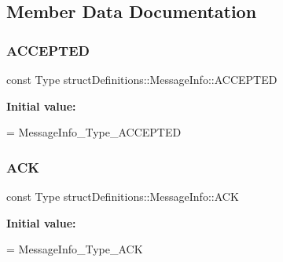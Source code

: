 \subsection{Member Data Documentation}
\hypertarget{classstruct_definitions_1_1_message_info_adf4fb3a2667aa56ebee6463c8fb68eed}{}\label{classstruct_definitions_1_1_message_info_adf4fb3a2667aa56ebee6463c8fb68eed} 
\subsubsection{\texorpdfstring{A\+C\+C\+E\+P\+T\+ED}{ACCEPTED}}
{\footnotesize\ttfamily const Type struct\+Definitions\+::\+Message\+Info\+::\+A\+C\+C\+E\+P\+T\+ED\hspace{0.3cm}{\ttfamily [static]}}

{\bfseries Initial value\+:}
\begin{DoxyCode}
=
    MessageInfo\_Type\_ACCEPTED
\end{DoxyCode}
\hypertarget{classstruct_definitions_1_1_message_info_a7e96992e715ab125cf17b676b8d72ec8}{}\label{classstruct_definitions_1_1_message_info_a7e96992e715ab125cf17b676b8d72ec8} 
\subsubsection{\texorpdfstring{A\+CK}{ACK}}
{\footnotesize\ttfamily const Type struct\+Definitions\+::\+Message\+Info\+::\+A\+CK\hspace{0.3cm}{\ttfamily [static]}}

{\bfseries Initial value\+:}
\begin{DoxyCode}
=
    MessageInfo\_Type\_ACK
\end{DoxyCode}
\hypertarget{classstruct_definitions_1_1_message_info_acecaa9eb7addc489331d6b31fcf45dcd}{}\label{classstruct_definitions_1_1_message_info_acecaa9eb7addc489331d6b31fcf45dcd} 
